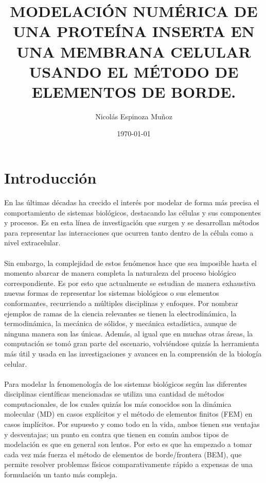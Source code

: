 \documentclass[12pt, oneside, numbers, spanish]{ezthesis}
\date{\today}
\author{Nicolás Espinoza Muñoz}
\title{MODELACIÓN NUMÉRICA DE UNA PROTEÍNA INSERTA EN UNA MEMBRANA CELULAR USANDO EL MÉTODO DE ELEMENTOS DE BORDE.}
\numberwithin{equation}{section}
\begin{document}


\newpage
\tableofcontents
\newpage

\chapter{Introducción}
En las últimas décadas ha crecido el interés por modelar de forma más precisa el comportamiento de sistemas biológicos, destacando las células y sus componentes y procesos. Es en esta línea de investigación que surgen y se desarrollan métodos para representar las interacciones que ocurren tanto dentro de la célula como a nivel extracelular.\\\\
Sin embargo, la complejidad de estos fenómenos hace que sea imposible hasta el momento abarcar de manera completa la naturaleza del proceso biológico correspondiente. Es por esto que actualmente se estudian de manera exhaustiva nuevas formas de representar los sistemas biológicos o sus elementos conformantes, recurriendo a múltiples disciplinas y enfoques. Por nombrar ejemplos de ramas de la ciencia relevantes se tienen la electrodinámica, la termodinámica, la mecánica de sólidos, y mecánica estadística, aunque de ninguna manera son las únicas. Además, al igual que en muchas otras áreas, la computación se tomó gran parte del escenario, volviéndose quizás la herramienta más útil y usada en las investigaciones y avances en la comprensión de la biología celular.\\\\
Para modelar la fenomenología de los sistemas biológicos según las diferentes disciplinas científicas mencionadas se utiliza una cantidad de métodos computacionales, de los cuales quizás los más conocidos son la dinámica molecular (MD) en casos explícitos y el método de elementos finitos (FEM) en casos implícitos. Por supuesto y como todo en la vida, ambos tienen sus ventajas y desventajas; un punto en contra que tienen en común ambos tipos de modelación es que en general son lentos. Por esto es que ha empezado a tomar cada vez más fuerza el método de elementos de borde/frontera (BEM), que permite resolver problemas físicos comparativamente rápido a expensas de una formulación un tanto más compleja.\\\\
\end{document}
